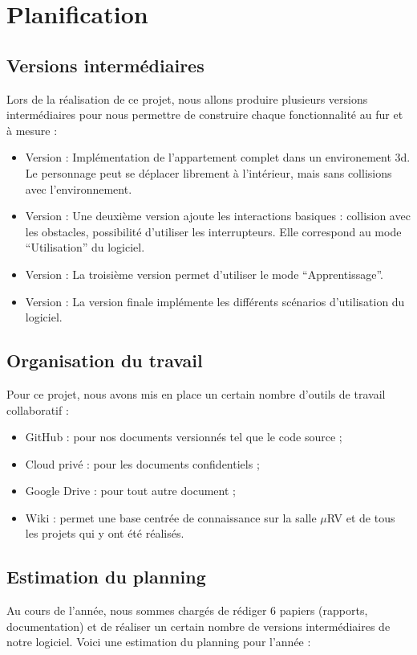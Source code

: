 \section{Planification}
\subsection{Versions intermédiaires}
Lors de la réalisation de ce projet, nous allons produire plusieurs versions intermédiaires pour nous permettre de construire chaque fonctionnalité au fur et à mesure :
\begin{itemize}
  \item Version  : Implémentation de l'appartement complet dans un environement 3d. Le personnage peut se déplacer librement à l'intérieur, mais sans collisions avec l'environnement.
  \item Version  : Une deuxième version ajoute les interactions basiques : collision avec les obstacles, possibilité d'utiliser les interrupteurs. Elle correspond au mode \enquote{Utilisation} du logiciel.
  \item Version  : La troisième version permet d'utiliser le mode \enquote{Apprentissage}.
  \item Version  : La version finale implémente les différents scénarios d'utilisation du logiciel.
\end{itemize}

\subsection{Organisation du travail}
Pour ce projet, nous avons mis en place un certain nombre d'outils de travail collaboratif :

\begin{itemize}
  \item GitHub : pour nos documents versionnés tel que le code source ;
  \item Cloud privé : pour les documents confidentiels ;
  \item Google Drive : pour tout autre document ;
  \item Wiki : permet une base centrée de connaissance sur la salle $\mu$RV et de tous les projets qui y ont été réalisés.
\end{itemize}


\subsection{Estimation du planning}
Au cours de l'année, nous sommes chargés de rédiger 6 papiers (rapports, documentation) et de réaliser un certain nombre de versions intermédiaires de notre logiciel.
Voici une estimation du planning pour l'année :
\\
\\

